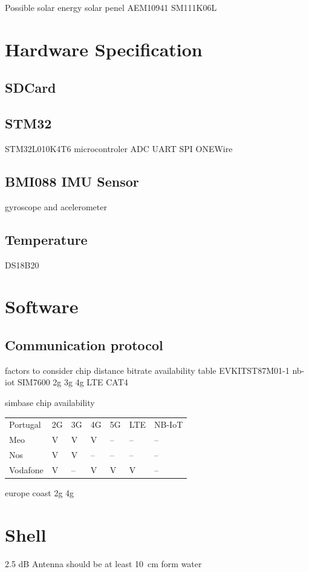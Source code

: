 Possible solar energy
solar penel
AEM10941
SM111K06L

\section{Hardware Specification}
\subsection{SDCard}
\subsection{STM32}

STM32L010K4T6
microcontroler
ADC
UART
SPI
ONEWire
\subsection{BMI088 IMU Sensor}
gyroscope and acelerometer


\subsection{Temperature}
DS18B20
\section{Software}

\subsection{Communication protocol}

factors to consider
chip
distance
bitrate
availability
table
EVKITST87M01-1 nb-iot
SIM7600 2g 3g 4g LTE CAT4

simbase chip availability

\begin{table}
    \centering
    \begin{tabular}{lllllll}
    Portugal & 2G & 3G & 4G & 5G & LTE & NB-IoT   \\
    Meo      & V  & V  & V  & -- & --  & --       \\
    Nos      & V  & V  & -- & -- & --  & --       \\
    Vodafone & V  & -- & V  & V  & V   & -- 
    \end{tabular}
\end{table}

europe coast
2g 4g


\section{Shell}
2.5 dB Antenna should be at least 10 cm form water 


